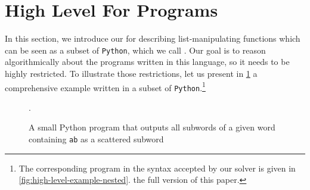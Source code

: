 \section{High Level For Programs}
\label{sec:high-level}

\AP In this section, we introduce our  for
describing list-manipulating functions which can be seen as a subset of
\texttt{Python}, which we call . Our goal is
to reason algorithmically about the programs written in this language, so it
needs to be highly restricted. To illustrate those restrictions, let us present
in \cref{fig:python-example-nested}
a comprehensive example written in a subset of \texttt{Python}.\footnote{The
corresponding program in the syntax accepted by our solver is given in
\iflongversion
\cref{fig:high-level-example-nested}.
\else
the full version of this paper.}

\begin{figure}[h]
    \centering
    
    \caption{A small Python program that
        outputs all subwords of a given word containing \texttt{ab}
        as a scattered subword}.
    \label{fig:python-example-nested}
\end{figure}

